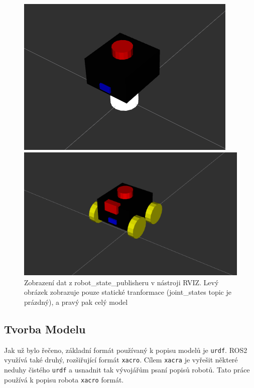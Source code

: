 \begin{figure}[h!]
	\centering
	\begin{minipage}[c]{0.5\textwidth}
		\centering
		\includegraphics[scale=0.45]{obrazky-figures/robot_description_no_joint_states.png}
	\end{minipage}%
	\begin{minipage}[c]{0.5\textwidth}
		\centering
		\includegraphics[scale=0.4]{obrazky-figures/robot_description_joint_states.png}
	\end{minipage}
	\caption{Zobrazení dat z robot\_state\_publisheru v nástroji RVIZ. Levý obrázek zobrazuje pouze statické tranformace (joint\_states topic je prázdný), a pravý pak celý model}
	\label{}
\end{figure}

\subsection*{Tvorba Modelu}
Jak už bylo řečeno, základní formát používaný k popisu modelů je \verb|urdf|. ROS2 využívá také druhý, rozšiřující formát \verb|xacro|. Cílem \verb|xacra| je vyřešit některé neduhy čistého \verb|urdf| a  usnadnit tak vývojářům psaní popisů robotů. Tato práce používá k popisu robota \verb|xacro| formát.

